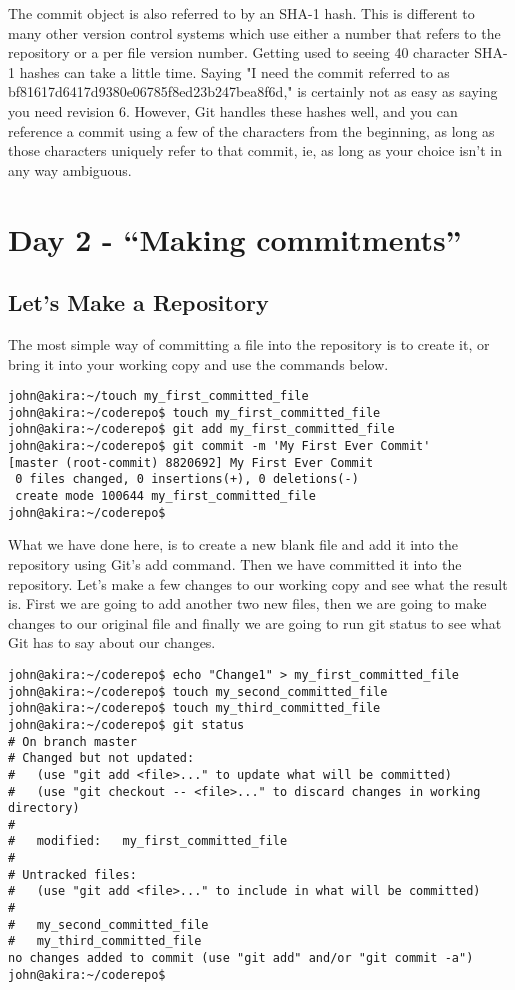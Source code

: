The commit object is also referred to by an SHA-1 hash.  This is different to many other version control systems which use either a number that refers to the repository or a per file version number.  Getting used to seeing 40 character SHA-1 hashes can take a little time.  Saying "I need the commit referred to as  bf81617d6417d9380e06785f8ed23b247bea8f6d," is certainly not as easy as saying you need revision 6.  However, Git handles these hashes well, and you can reference a commit using a few of the characters from the beginning, as long as those characters uniquely refer to that commit, ie, as long as your choice isn't in any way ambiguous.

\section*{Day 2 - ``Making commitments''}
\subsection{Let's Make a Repository}

The most simple way of committing a file into the repository is to create it, or bring it into your working copy and use the commands below.

\begin{verbatim} 
john@akira:~/touch my_first_committed_file
john@akira:~/coderepo$ touch my_first_committed_file
john@akira:~/coderepo$ git add my_first_committed_file
john@akira:~/coderepo$ git commit -m 'My First Ever Commit'
[master (root-commit) 8820692] My First Ever Commit
 0 files changed, 0 insertions(+), 0 deletions(-)
 create mode 100644 my_first_committed_file
john@akira:~/coderepo$
\end{verbatim} 

What we have done here, is to create a new blank file and add it into the repository using Git's add command.  Then we have committed it into the repository.  Let's make a few changes to our working copy and see what the result is.  First we are going to add another two new files, then we are going to make changes to our original file and finally we are going to run git status to see what Git has to say about our changes.

\begin{verbatim} 
john@akira:~/coderepo$ echo "Change1" > my_first_committed_file 
john@akira:~/coderepo$ touch my_second_committed_file
john@akira:~/coderepo$ touch my_third_committed_file
john@akira:~/coderepo$ git status
# On branch master
# Changed but not updated:
#   (use "git add <file>..." to update what will be committed)
#   (use "git checkout -- <file>..." to discard changes in working directory)
#
#	modified:   my_first_committed_file
#
# Untracked files:
#   (use "git add <file>..." to include in what will be committed)
#
#	my_second_committed_file
#	my_third_committed_file
no changes added to commit (use "git add" and/or "git commit -a")
john@akira:~/coderepo$ 
\end{verbatim} 

